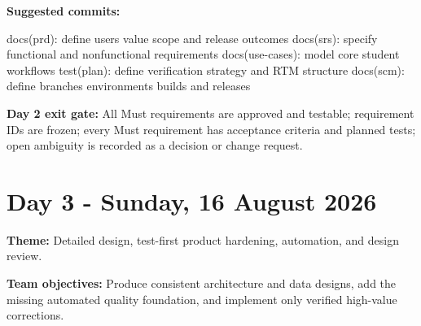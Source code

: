 \documentclass[
  10pt,
  a4paper,
  oneside]{report}
\newenvironment{Shaded}{}{}
\newcommand{\NormalTok}[1]{#1}
\begin{document}
\textbf{Suggested commits:}

\begin{Shaded}
\begin{Highlighting}[]
\NormalTok{docs(prd): define users value scope and release outcomes}
\NormalTok{docs(srs): specify functional and nonfunctional requirements}
\NormalTok{docs(use{-}cases): model core student workflows}
\NormalTok{test(plan): define verification strategy and RTM structure}
\NormalTok{docs(scm): define branches environments builds and releases}
\end{Highlighting}
\end{Shaded}

\textbf{Day 2 exit gate:} All Must requirements are approved and
testable; requirement IDs are frozen; every Must requirement has
acceptance criteria and planned tests; open ambiguity is recorded as a
decision or change request.

\section{Day 3 - Sunday, 16 August
2026}\label{day-3---sunday-16-august-2026}

\textbf{Theme:} Detailed design, test-first product hardening,
automation, and design review.

\textbf{Team objectives:} Produce consistent architecture and data
designs, add the missing automated quality foundation, and implement
only verified high-value corrections.
\end{document}
